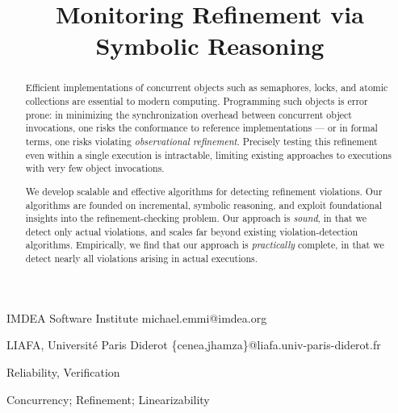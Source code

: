 \documentclass{sigplanconf}
\begin{document}
  \setlength{\pdfpageheight}{\paperheight}
  \setlength{\pdfpagewidth}{\paperwidth}


  \title{Monitoring Refinement via Symbolic Reasoning}

    {IMDEA Software Institute}
    {michael.emmi@imdea.org}

    {LIAFA, Université Paris Diderot}
    {\{cenea,jhamza\}@liafa.univ-paris-diderot.fr}

  \maketitle

  \begin{abstract}

    Efficient implementations of concurrent objects such as semaphores, locks,
    and atomic collections are essential to modern computing. Programming such
    objects is error prone: in minimizing the synchronization overhead between
    concurrent object invocations, one risks the conformance to reference
    implementations --- or in formal terms, one risks violating
    \emph{observational refinement}. Precisely testing this refinement even
    within a single execution is intractable, limiting existing approaches to
    executions with very few object invocations.

    We develop scalable and effective algorithms for detecting refinement
    violations. Our algorithms are founded on incremental, symbolic reasoning,
    and exploit foundational insights into the refinement-checking problem. Our
    approach is \emph{sound}, in that we detect only actual violations, and
    scales far beyond existing violation-detection algorithms. Empirically, we
    find that our approach is \emph{practically} complete, in that we detect
    nearly all violations arising in actual executions.

  \end{abstract}
  

  \terms
  Reliability, Verification

  \keywords
  Concurrency; Refinement; Linearizability

  
  
  
  
  
  
  
  
  
  
  
\end{document}
